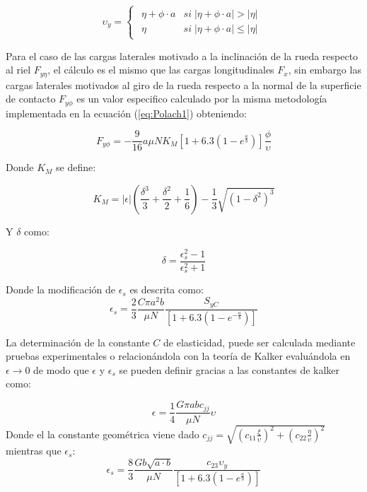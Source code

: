 \documentclass[main]{subfiles}
\begin{document}
\begin{equation}
\upsilon_y=
\begin{cases} 
\begin{matrix}
\eta+\phi \cdot a & si \; |\eta+\phi \cdot a|>|\eta|
\\
\eta & si \; |\eta+\phi \cdot a|\le|\eta|
\end{matrix}
\end{cases}
\end{equation}

Para el caso de las cargas laterales motivado a la inclinación de la rueda respecto al riel $F_{y\eta}$, el cálculo es el mismo que las cargas longitudinales $F_x$, sin embargo las cargas laterales motivados al giro de la rueda respecto a la normal de la superficie de contacto $F_{y\phi}$ es un valor especifico calculado por la misma metodología implementada en la ecuación (\ref{eq:Polach1}) obteniendo:

\begin{equation}
F_{y\phi}=-\frac{9}{16}a\mu N K_M \left[1+6.3\left(1-e^\frac{a}{b}\right)\right]\frac{\phi}{\upsilon}
\end{equation}

Donde $K_M$ se define:

\begin{equation}
K_M=|\epsilon |
\left(\frac{\delta^3}{3}+\frac{\delta^2}{2}+\frac{1}{6}\right)-\frac{1}{3}\sqrt{(1-\delta^2)^3}
\end{equation}

Y $\delta$ como:

\begin{equation}
\delta=\frac{\epsilon_s^2-1}{\epsilon_s^2+1}
\end{equation}

Donde la modificación de $\epsilon_s$ es descrita como:
\begin{equation}
\epsilon_s=
\frac{2}{3}
\frac{C\pi a^2 b}{\mu N}
\frac{ S_{yC}}{ \left[1+6.3\left(1-e^{-\frac{a}{b}}\right)\right]}
\end{equation}


La determinación de la constante $C$ de elasticidad, puede ser calculada mediante pruebas experimentales o relacionándola con la teoría de Kalker evaluándola en $\epsilon \rightarrow 0$ de modo que $\epsilon$ y $\epsilon_s$ se pueden definir gracias a las constantes de kalker como:

\begin{equation}
\epsilon=\frac{1}{4}\frac{G\pi a b c_{jj}}{\mu N}\upsilon
\end{equation}
Donde el la constante geométrica viene dado $c_{jj}=\sqrt{
\left(c_{11}\frac{\xi}{\upsilon}\right)^2
+
\left(c_{22}\frac{\eta}{\upsilon}\right)^2
}$ mientras que $\epsilon_s$:
\begin{equation}
\epsilon_s=\frac{8}{3}\frac{G b \sqrt{a\cdot b}}{\mu N}\frac{ c_{23}\upsilon_y}{ \left[1+6.3\left(1-e^\frac{a}{b}\right)\right]}
\end{equation}
\end{document}
